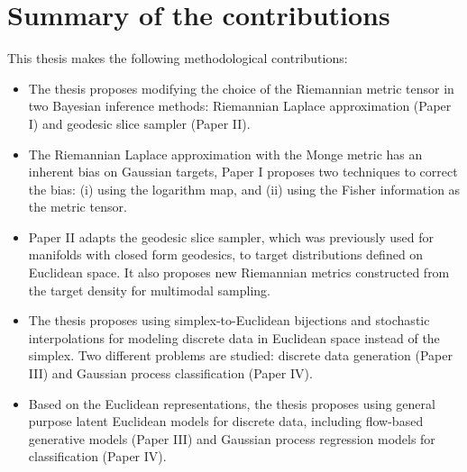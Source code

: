 \section*{Summary of the contributions} 
This thesis makes the following methodological contributions:
\begin{itemize}
    \item The thesis proposes modifying the choice of the Riemannian metric tensor in two Bayesian inference methods: Riemannian Laplace approximation ({Paper I}) and geodesic slice sampler ({Paper II}).
    \item  The Riemannian Laplace approximation with the Monge metric has an inherent bias on Gaussian targets, {Paper I} proposes two techniques to correct the bias: (i) using the logarithm map, and (ii) using the Fisher information as the metric tensor.
    \item {Paper II} adapts the geodesic slice sampler, which was previously used for manifolds with closed form geodesics, to target distributions defined on Euclidean space.  It also proposes new Riemannian metrics constructed from the target density for multimodal sampling. 
    \item The thesis proposes using simplex-to-Euclidean bijections and stochastic interpolations for modeling discrete data in Euclidean space instead of the simplex. Two different problems are studied: discrete data generation ({Paper III}) and  Gaussian process classification ({Paper IV}).     
    \item Based on the Euclidean representations, the thesis proposes using general purpose latent Euclidean models for discrete data, including flow-based generative models (Paper III) and Gaussian process regression models for classification (Paper IV).
    \end{itemize}
